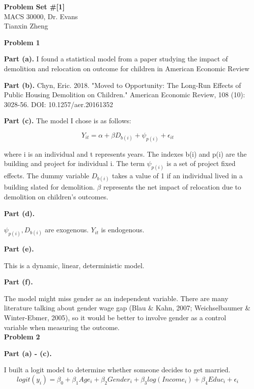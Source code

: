 \documentclass[letterpaper,12pt]{article}
\theoremstyle{definition}
\begin{document}
\begin{flushleft}
  \textbf{\large{Problem Set \#[1]}} \\
  MACS 30000, Dr. Evans \\
  Tianxin Zheng
\end{flushleft}

\vspace{5mm}

\noindent\textbf{Problem 1}

\textbf{Part (a).} 
I found a statistical model from a paper studying the impact of demolition and relocation on outcome for children in American Economic Review

\textbf{Part (b).} 
Chyn, Eric. 2018. "Moved to Opportunity: The Long-Run Effects of Public Housing Demolition on Children." American Economic Review, 108 (10): 3028-56.
DOI: 10.1257/aer.20161352

\textbf{Part (c).} 
The model I chose is as follows:

\begin{equation*}
  Y_{it} = \alpha + \beta D _{b(i)} + \psi _{p(i)} + \epsilon_{it}
\end{equation*}

where i is an individual and t represents years. The indexes b(i) and p(i) are the building and project for individual i. The term    $\psi_{p(i)}$ is a set of project fixed effects. The dummy variable $D_{b(i)}$ takes a value of 1 if an individual lived in a building slated for demolition.  $\beta$ represents the net impact of relocation due to demolition on children’s outcomes.


\textbf{Part (d).} 


$ \psi _{p(i)}, D _{b(i)}$ are exogenous.
 $Y_{it}$ is endogenous.


\textbf{Part (e).} 

This is a dynamic, linear, deterministic model. 

\textbf{Part (f).} 

The model might miss gender as an independent variable.
There are many literature talking about gender wage gap (Blau \& Kahn, 2007; Weichselbaumer \& Winter-Ebmer, 2005), so it would be better to involve gender as a control variable when measuring the outcome.\\



 
\noindent\textbf{Problem 2}
 
\textbf{Part (a) - (c).} 
 
 I built a logit model to determine whether someone decides to get married. 
\begin{equation*}
logit(y_{i}) = \beta_{0} + \beta_{1}Age_{i} + \beta _{2}Gender_{i} + \beta_{3}log(Income_{i}) + \beta_{4}Educ_{i} + \epsilon_{i}
\end{equation*}
\end{document}
